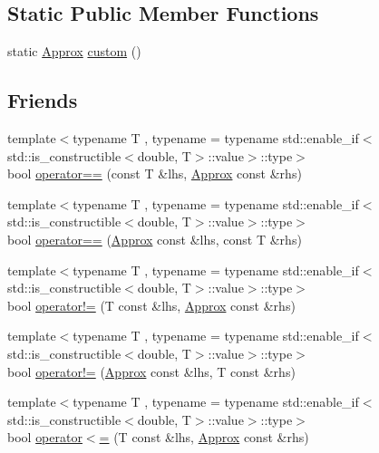 \subsection*{Static Public Member Functions}
\begin{DoxyCompactItemize}
\item 
static \mbox{\hyperlink{class_catch_1_1_detail_1_1_approx}{Approx}} \mbox{\hyperlink{class_catch_1_1_detail_1_1_approx_aaf86dc0ee92272ac2d9839197a07951d}{custom}} ()
\end{DoxyCompactItemize}
\subsection*{Friends}
\begin{DoxyCompactItemize}
\item 
{\footnotesize template$<$typename T , typename  = typename std\+::enable\+\_\+if$<$std\+::is\+\_\+constructible$<$double, T$>$\+::value$>$\+::type$>$ }\\bool \mbox{\hyperlink{class_catch_1_1_detail_1_1_approx_ab38782a37d09b527ca5e126dbf433dda}{operator==}} (const T \&lhs, \mbox{\hyperlink{class_catch_1_1_detail_1_1_approx}{Approx}} const \&rhs)
\item 
{\footnotesize template$<$typename T , typename  = typename std\+::enable\+\_\+if$<$std\+::is\+\_\+constructible$<$double, T$>$\+::value$>$\+::type$>$ }\\bool \mbox{\hyperlink{class_catch_1_1_detail_1_1_approx_a0e5ef1957d4c38d7857005909c613743}{operator==}} (\mbox{\hyperlink{class_catch_1_1_detail_1_1_approx}{Approx}} const \&lhs, const T \&rhs)
\item 
{\footnotesize template$<$typename T , typename  = typename std\+::enable\+\_\+if$<$std\+::is\+\_\+constructible$<$double, T$>$\+::value$>$\+::type$>$ }\\bool \mbox{\hyperlink{class_catch_1_1_detail_1_1_approx_a29696f14ebd51887c8c88e771d12ef54}{operator!=}} (T const \&lhs, \mbox{\hyperlink{class_catch_1_1_detail_1_1_approx}{Approx}} const \&rhs)
\item 
{\footnotesize template$<$typename T , typename  = typename std\+::enable\+\_\+if$<$std\+::is\+\_\+constructible$<$double, T$>$\+::value$>$\+::type$>$ }\\bool \mbox{\hyperlink{class_catch_1_1_detail_1_1_approx_a31d62e3c35abb86cf25e02601966ca5d}{operator!=}} (\mbox{\hyperlink{class_catch_1_1_detail_1_1_approx}{Approx}} const \&lhs, T const \&rhs)
\item 
{\footnotesize template$<$typename T , typename  = typename std\+::enable\+\_\+if$<$std\+::is\+\_\+constructible$<$double, T$>$\+::value$>$\+::type$>$ }\\bool \mbox{\hyperlink{class_catch_1_1_detail_1_1_approx_a0369de03e81bc2ceaf6c9d830476bd49}{operator$<$=}} (T const \&lhs, \mbox{\hyperlink{class_catch_1_1_detail_1_1_approx}{Approx}} const \&rhs)

\end{DoxyCompactItemize}
